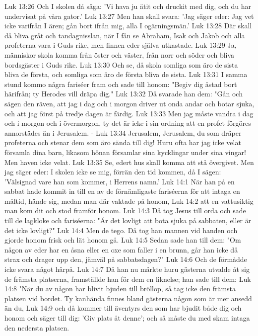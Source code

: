 Luk 13:26  Och I skolen då säga: 'Vi hava ju ätit och druckit med dig, och du har undervisat på våra gator.'
Luk 13:27  Men han skall svara: 'Jag säger eder: Jag vet icke varifrån I ären; gån bort ifrån mig, alla I ogärningsmän.'
Luk 13:28  Där skall då bliva gråt och tandagnisslan, när I fån se Abraham, Isak och Jakob och alla profeterna vara i Guds rike, men finnen eder själva utkastade.
Luk 13:29  Ja, människor skola komma från öster och väster, från norr och söder och bliva bordsgäster i Guds rike.
Luk 13:30  Och se, då skola somliga som äro de sista bliva de första, och somliga som äro de första bliva de sista.
Luk 13:31  I samma stund kommo några fariséer fram och sade till honom: "Begiv dig åstad bort härifrån; ty Herodes vill dräpa dig."
Luk 13:32  Då svarade han dem: "Gån och sägen den räven, att jag i dag och i morgon driver ut onda andar och botar sjuka, och att jag först på tredje dagen är färdig.
Luk 13:33  Men jag måste vandra i dag och i morgon och i övermorgon, ty det är icke i sin ordning att en profet förgöres annorstädes än i Jerusalem. -
Luk 13:34  Jerusalem, Jerusalem, du som dräper profeterna och stenar dem som äro sända till dig! Huru ofta har jag icke velat församla dina barn, likasom hönan församlar sina kycklingar under sina vingar! Men haven icke velat.
Luk 13:35  Se, edert hus skall komma att stå övergivet. Men jag säger eder: I skolen icke se mig, förrän den tid kommen, då I sägen: 'Välsignad vare han som kommer, i Herrens namn.'
Luk 14:1  När han på en sabbat hade kommit in till en av de förnämligaste fariséerna för att intaga en måltid, hände sig, medan man där vaktade på honom,
Luk 14:2  att en vattusiktig man kom dit och stod framför honom.
Luk 14:3  Då tog Jesus till orda och sade till de lagkloke och fariséerna: "Är det lovligt att bota sjuka på sabbaten, eller är det icke lovligt?"
Luk 14:4  Men de tego. Då tog han mannen vid handen och gjorde honom frisk och lät honom gå.
Luk 14:5  Sedan sade han till dem: "Om någon av eder har en åsna eller en oxe som faller i en brunn, går han icke då strax och drager upp den, jämväl på sabbatsdagen?"
Luk 14:6  Och de förmådde icke svara något härpå.
Luk 14:7  Då han nu märkte huru gästerna utvalde åt sig de främsta platserna, framställde han för dem en liknelse; han sade till dem:
Luk 14:8  "När du av någon har blivit bjuden till bröllop, så tag icke den främsta platsen vid bordet. Ty kanhända finnes bland gästerna någon som är mer ansedd än du,
Luk 14:9  och då kommer till äventyrs den som har bjudit både dig och honom och säger till dig: 'Giv plats åt denne'; och så måste du med skam intaga den nedersta platsen.
